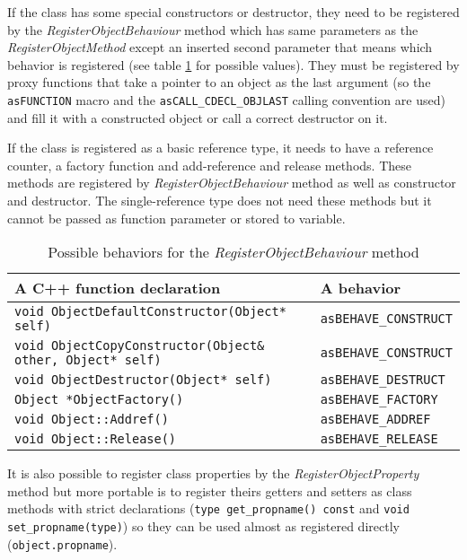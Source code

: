 If the class has some special constructors or destructor, they need to be registered by the \emph{RegisterObjectBehaviour} method which has same parameters as the \emph{RegisterObjectMethod} except an inserted second parameter that means which behavior is registered (see table \ref{tab:script-behaviors} for possible values). They must be registered by proxy functions that take a pointer to an object as the last argument (so the \verb/asFUNCTION/ macro and the \verb/asCALL_CDECL_OBJLAST/ calling convention are used) and fill it with a constructed object or call a correct destructor on it.

If the class is registered as a basic reference type, it needs to have a reference counter, a factory function and add-reference and release methods. These methods are registered by \emph{RegisterObjectBehaviour} method as well as constructor and destructor. The single-reference type does not need these methods but it cannot be passed as function parameter or stored to variable.

\begin{table}[htbp]
	\centering
		{\scriptsize
		\begin{tabular}{|p{0.63\hsize}|p{0.30\hsize}|}
		\hline
		A C++ function declaration & A behavior\\
		\hline
		\verb/void ObjectDefaultConstructor(Object* self)/ & \verb/asBEHAVE_CONSTRUCT/\\
		\verb/void ObjectCopyConstructor(Object& other, Object* self)/ & \verb/asBEHAVE_CONSTRUCT/\\
		\verb/void ObjectDestructor(Object* self)/ & \verb/asBEHAVE_DESTRUCT/\\
		\verb/Object *ObjectFactory()/ & \verb/asBEHAVE_FACTORY/\\
		\verb/void Object::Addref()/ & \verb/asBEHAVE_ADDREF/\\
		\verb/void Object::Release()/ & \verb/asBEHAVE_RELEASE/\\
		\hline
		\end{tabular}
		}
	\caption{Possible behaviors for the \emph{RegisterObjectBehaviour} method}
	\label{tab:script-behaviors}
\end{table}

It is also possible to register class properties by the \emph{RegisterObjectProperty} method but more portable is to register theirs getters and setters as class methods with strict declarations (\verb/type get_propname() const/ and \verb/void set_propname(type)/) so they can be used almost as registered directly (\verb/object.propname/).

